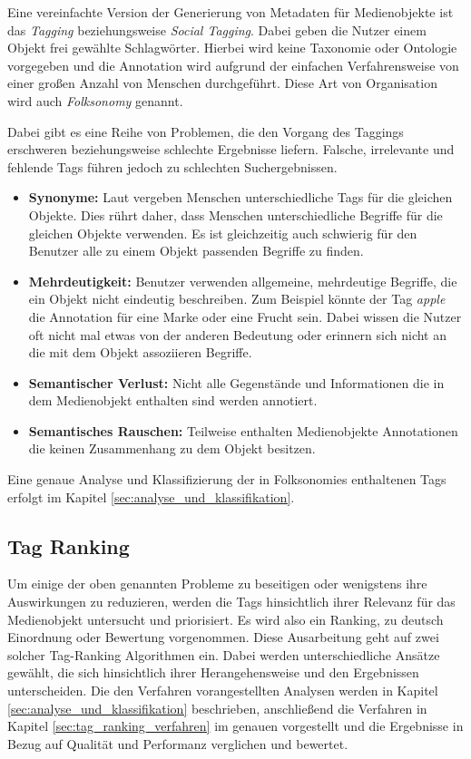 Eine vereinfachte Version der Generierung von Metadaten für Medienobjekte ist das \emph{Tagging} beziehungsweise \emph{Social Tagging}. Dabei geben die Nutzer einem Objekt frei gewählte Schlagwörter. Hierbei wird keine Taxonomie oder Ontologie vorgegeben und die Annotation wird aufgrund der einfachen Verfahrensweise von einer großen Anzahl von Menschen durchgeführt. Diese Art von Organisation wird auch \emph{Folksonomy} genannt.

Dabei gibt es eine Reihe von Problemen, die den Vorgang des Taggings erschweren beziehungsweise schlechte Ergebnisse liefern. Falsche, irrelevante und fehlende Tags führen jedoch zu schlechten Suchergebnissen.

\begin{itemize}
  \item \textbf{Synonyme:} Laut \cite{learningToTag} vergeben Menschen unterschiedliche Tags für die gleichen Objekte. Dies rührt daher, dass Menschen unterschiedliche Begriffe für die gleichen Objekte verwenden. Es ist gleichzeitig auch schwierig für den Benutzer alle zu einem Objekt passenden Begriffe zu finden.
  \item \textbf{Mehrdeutigkeit:} Benutzer verwenden allgemeine, mehrdeutige Begriffe, die ein Objekt nicht eindeutig beschreiben. Zum Beispiel könnte der Tag \emph{apple} die Annotation für eine Marke oder eine Frucht sein. Dabei wissen die Nutzer oft nicht mal etwas von der anderen Bedeutung oder erinnern sich nicht an die mit dem Objekt assoziieren Begriffe.
  \item \textbf{Semantischer Verlust:} Nicht alle Gegenstände und Informationen die in dem Medienobjekt enthalten sind werden annotiert.
  \item \textbf{Semantisches Rauschen:} Teilweise enthalten Medienobjekte Annotationen die keinen Zusammenhang zu dem Objekt besitzen.
\end{itemize}


Eine genaue Analyse und Klassifizierung der in Folksonomies enthaltenen Tags erfolgt im Kapitel \ref{sec:analyse_und_klassifikation}.

\subsection{Tag Ranking} %
\label{sub:tag_ranking}

Um einige der oben genannten Probleme zu beseitigen oder wenigstens ihre Auswirkungen zu reduzieren, werden die Tags hinsichtlich ihrer Relevanz für das Medienobjekt untersucht und priorisiert. Es wird also ein Ranking, zu deutsch Einordnung oder Bewertung vorgenommen. Diese Ausarbeitung geht auf zwei solcher Tag-Ranking Algorithmen ein. Dabei werden unterschiedliche Ansätze gewählt, die sich hinsichtlich ihrer Herangehensweise und den Ergebnissen unterscheiden. Die den Verfahren vorangestellten Analysen werden in Kapitel \ref{sec:analyse_und_klassifikation} beschrieben, anschließend die Verfahren in Kapitel \ref{sec:tag_ranking_verfahren} im genauen vorgestellt und die Ergebnisse in Bezug auf Qualität und Performanz verglichen und bewertet.

